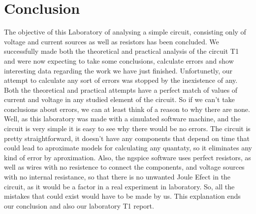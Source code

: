 \section{Conclusion}
\label{sec:conclusion}

The objective of this Laboratory of analysing a simple circuit, consisting only of voltage and current sources as well as resistors has been concluded. We successfully made both the theoretical and practical analysis of the circuit T1 and were now expecting to take some conclusions, calculate errors and show interesting data regarding the work we have just finished. Unfortunetly, our attempt to calculate any sort of errors was stopped by the inexistence of any. Both the theoretical and practical attempts have a perfect match of values of current and voltage in any studied element of the circuit. So if we can't take conclusions about errors, we can at least think of a reason to why there are none.
Well, as this laboratory was made with a simulated software machine, and the circuit is very simple it is easy to see why there would be no errors. The circuit is pretty straightforward, it doesn't have any components that depend on time that could lead to aproximate models for calculating any quantaty, so it eliminates any kind of error by aproximation. 
Also, the ngspice software uses perfect resistors, as well as wires with no resistence to connect the components, and voltage sources with no internal resistance, so that there is no unwanted Joule Efect in the circuit, as it would be a factor in a real experiment in laboratory. So, all the mistakes that could exist would have to be made by us.
This explanation ends our conclusion and also our laboratory T1 report.


